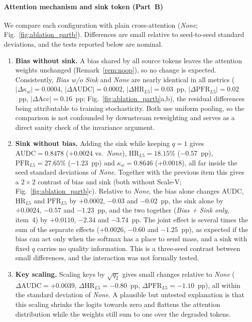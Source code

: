 \documentclass[final,5p,times,twocolumn,authoryear]{elsarticle}
\theoremstyle{plain}
\theoremstyle{remark}
\begin{document}
\paragraph{Attention mechanism and sink token (Part~B)} We compare each configuration with plain cross-attention (\emph{None}; Fig.~\ref{fig:ablation_partb}). Differences are small relative to seed-to-seed standard deviations, and the tests reported below are nominal.
\begin{enumerate}
  \item \textbf{Bias without sink.} A bias shared by all source tokens leaves the attention weights unchanged (Remark~\ref{rem:noop}), so no change is expected. Consistently, \emph{Bias w/o Sink} and \emph{None} are nearly identical in all metrics ($|\Delta\kappa_w| = 0.0004$, $|\Delta\text{AUDC}| = 0.0002$, $|\Delta\text{HR}_{L5}| = 0.03$~pp, $|\Delta\text{PFR}_{L5}| = 0.02$~pp, $|\Delta\text{Acc}| = 0.16$~pp; Fig.~\ref{fig:ablation_partb}a,b), the residual differences being attributable to training stochasticity. Both use uniform pooling, so the comparison is not confounded by downstream reweighting and serves as a direct sanity check of the invariance argument.
  \item \textbf{Sink without bias.} Adding the sink while keeping $q=1$ gives $\text{AUDC}=0.8478$ ($+0.0024$ vs.\ \emph{None}), $\text{HR}_{L5}=18.15\%$ ($-0.57$~pp), $\text{PFR}_{L5}=27.65\%$ ($-1.23$~pp) and $\kappa_w=0.8646$ ($+0.0018$), all far inside the seed standard deviations of \emph{None}. Together with the previous item this gives a $2\times2$ contrast of bias and sink (both without Scale-V; Fig.~\ref{fig:ablation_partb}c). Relative to \emph{None}, the bias alone changes AUDC, $\text{HR}_{L5}$ and $\text{PFR}_{L5}$ by $+0.0002$, $-0.03$ and $-0.02$~pp, the sink alone by $+0.0024$, $-0.57$ and $-1.23$~pp, and the two together (\emph{Bias + Sink only}, item~4) by $+0.0110$, $-2.34$ and $-3.74$~pp. The joint effect is several times the sum of the separate effects ($+0.0026$, $-0.60$ and $-1.25$~pp), as expected if the bias can act only when the softmax has a place to send mass, and a sink with fixed $q$ carries no quality information. This is a three-seed contrast between small differences, and the interaction was not formally tested.
  \item \textbf{Key scaling.} Scaling keys by $\sqrt{q_2}$ gives small changes relative to \emph{None} ($\Delta\text{AUDC} = +0.0039$, $\Delta\text{HR}_{L5} = -0.80$~pp, $\Delta\text{PFR}_{L5} = -1.10$~pp), all within the standard deviation of \emph{None}. A plausible but untested explanation is that this scaling shrinks the logits towards zero and flattens the attention distribution while the weights still sum to one over the degraded tokens.

\end{enumerate}
\end{document}
